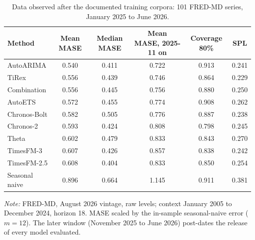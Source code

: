 \documentclass[ASNA]{USG}
\begin{document}
\begin{table}[!htbp]
\centering
\begin{threeparttable}
\caption{Data observed after the documented training corpora: 101 FRED-MD series, January 2025 to June 2026.}
\label{tab:si-postcutoff}
\small\setlength{\tabcolsep}{4pt}
\begin{tabular}{lccccc}
\toprule
Method & Mean MASE & Median MASE & Mean MASE, 2025-11 on & Coverage 80\% & SPL \\
\midrule
AutoARIMA & 0.540 & 0.411 & 0.722 & 0.913 & 0.241 \\
TiRex & 0.556 & 0.439 & 0.746 & 0.864 & 0.229 \\
Combination & 0.556 & 0.445 & 0.756 & 0.880 & 0.250 \\
AutoETS & 0.572 & 0.455 & 0.774 & 0.908 & 0.262 \\
Chronos-Bolt & 0.582 & 0.505 & 0.776 & 0.887 & 0.238 \\
Chronos-2 & 0.593 & 0.424 & 0.808 & 0.798 & 0.245 \\
Theta & 0.602 & 0.479 & 0.833 & 0.843 & 0.270 \\
TimesFM-3 & 0.607 & 0.426 & 0.857 & 0.838 & 0.242 \\
TimesFM-2.5 & 0.608 & 0.404 & 0.833 & 0.850 & 0.254 \\
Seasonal naive & 0.896 & 0.664 & 1.145 & 0.911 & 0.381 \\
\bottomrule
\end{tabular}
\begin{tablenotes}[flushleft]\footnotesize
\item \textit{Note:} FRED-MD, August 2026 vintage, raw levels; context January 2005 to December 2024, horizon 18. MASE scaled by the in-sample seasonal-naive error ($m = 12$). The later window (November 2025 to June 2026) post-dates the release of every model evaluated.
\end{tablenotes}
\end{threeparttable}
\end{table}
\end{document}
